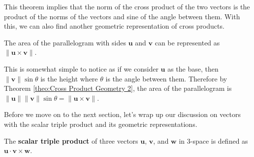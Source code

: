 \documentclass[../../../main.tex]{subfiles}
\begin{document}
This theorem implies that the norm of the cross product of the
two vectors is the product of the norms of the vectors and sine of
the angle between them. With this, we can also find another geometric
representation of cross products.

\begin{important}
The area of the parallelogram with sides $\mathbf{u}$ and $\mathbf{v}$
can be represented as $\| \mathbf{u} \times \mathbf{v} \|$.
\end{important}

This is somewhat simple to notice as if we consider $\mathbf{u}$
as the base, then $\| \mathbf{v} \| \sin\theta$ is the height
where $\theta$ is the angle between them. Therefore by Theorem
\ref{theo:Cross Product Geometry 2}, the area of the parallelogram
is $\| \mathbf{u} \| \| \mathbf{v} \| \sin\theta =
\| \mathbf{u} \times \mathbf{v} \|$.

Before we move on to the next section, let's wrap up our discussion
on vectors with the scalar triple product and its geometric
representations.

\begin{definition}{}{}
The \textbf{scalar triple product} of three vectors $\mathbf{u}$,
$\mathbf{v}$, and $\mathbf{w}$ in 3-space is defined as
$\mathbf{u} \cdot \mathbf{v} \times \mathbf{w}$.
\end{definition}
\end{document}

